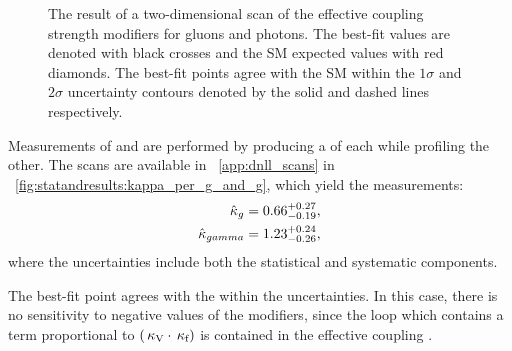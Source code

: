 \begin{figure}[ht!]
\centering
\caption{The result of a two-dimensional \DNLL scan of the effective coupling strength modifiers for gluons and photons. The best-fit values are denoted with black crosses and the SM expected values with red diamonds. The best-fit points agree with the SM within the $1\sigma$ and $2\sigma$ uncertainty contours denoted by the solid and dashed lines respectively.}
\label{fig:statandresults:kappa_plots_kgkp}
\end{figure}
Measurements of \kGlu and \kPho are performed by producing a \DNLL of each \POI while profiling the other.
The scans are available in \App~\ref{app:dnll_scans} in \Fig~\ref{fig:statandresults:kappa_per_g_and_g}, which yield the measurements:
\begin{equation*}
\begin{split}
\hat{\kappa}_{g} = 0.66^{+0.27}_{-0.19}, \\
\hat{\kappa}_{gamma} = 1.23^{+0.24}_{-0.26},
\end{split}
\end{equation*}
where the uncertainties include both the statistical and systematic components.

The best-fit point agrees with the \SM within the uncertainties. In this case, there is no sensitivity to negative values of the modifiers, since the \Hgg loop which contains a term proportional to $(\,\kappa_\text{V}\cdot\,\kappa_\text{f})$ is contained in the effective coupling \kPho. 




